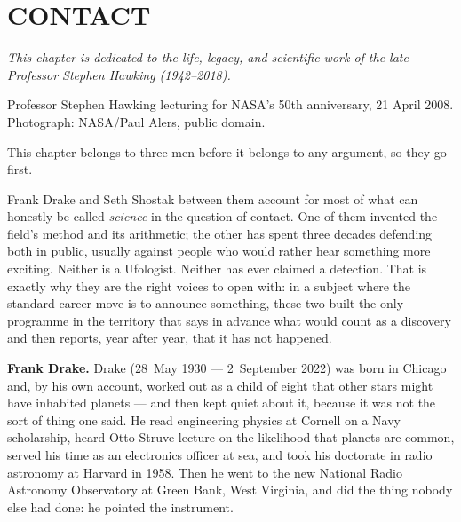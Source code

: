 \chapter{CONTACT}\label{ch:contact}



\begin{center}
\vspace{-10pt}
{\itshape\color{steel} This chapter is dedicated to the life, legacy, and scientific work of the
late Professor Stephen Hawking (1942--2018).}\par
\vspace{6pt}
\par\vspace{4pt}
{\RaggedRight\scriptsize\color{steel}Professor Stephen Hawking lecturing for NASA's 50th anniversary,
21 April 2008. Photograph: NASA/Paul Alers, public domain.\par
{} \par}
\end{center}

\clearpage

This chapter belongs to three men before it belongs to any argument, so they go first.

Frank Drake and Seth Shostak between them account for most of what can honestly be called
\emph{science} in the question of contact. One of them invented the field's method and its
arithmetic; the other has spent three decades defending both in public, usually against people
who would rather hear something more exciting. Neither is a Ufologist. Neither has ever claimed a
detection. That is exactly why they are the right voices to open with: in a subject where the
standard career move is to announce something, these two built the only programme in the territory
that says in advance what would count as a discovery and then reports, year after year, that it has
not happened.

\medskip\noindent\textbf{Frank Drake.}
Drake (28~May 1930 --- 2~September 2022) was born in Chicago and, by his own account, worked out
as a child of eight that other stars might have inhabited planets --- and then kept quiet about it,
because it was not the sort of thing one said. He read engineering physics at Cornell on a Navy
scholarship, heard Otto Struve lecture on the likelihood that planets are common, served his time as
an electronics officer at sea, and took his doctorate in radio astronomy at Harvard in 1958. Then he
went to the new National Radio Astronomy Observatory at Green Bank, West Virginia, and did the thing
nobody else had done: he pointed the instrument.


